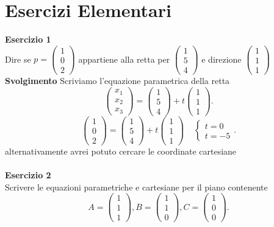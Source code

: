 \documentclass[12px]{article}
\theoremstyle{break}
\theoremstyle{break}
\theoremstyle{break}
\theoremstyle{break}
\theoremstyle{break}
\theoremstyle{break}
\theoremstyle{break}
\newcommand{\icol}[1]{%
  \left(\begin{smallmatrix}#1\end{smallmatrix}\right)%
}
\begin{document}
	\section{Esercizi Elementari}
	\textbf{Esercizio 1} \\
	Dire se $p = \icol{1\\0\\2}$ appartiene alla retta per $\icol{1\\5\\4}$
	e direzione $\icol{1\\1\\1}$
	\textbf{Svolgimento}
	Scriviamo l'equazione parametrica della retta
	\[
		\icol{x_1\\x_2\\x_3} = \icol{1\\5\\4} + t\icol{1\\1\\1}
	.\]
	\[
		\icol{1\\0\\2} = \icol{1\\5\\4} + t\icol{1\\1\\1} \ \ \ \ \ \begin{cases}
			t = 0\\
			t = -5
		\end{cases}
	.\] 
	alternativamente avrei potuto cercare le coordinate cartesiane\\
	\hline \ \\
	\textbf{Esercizio 2} \\
	Scrivere le equazioni parametriche e cartesiane per il piano contenente 
	\[
		A = \icol{1\\1\\1}, B = \icol{1\\1\\0},C = \icol{1\\0\\0}
	.\]
\end{document}
